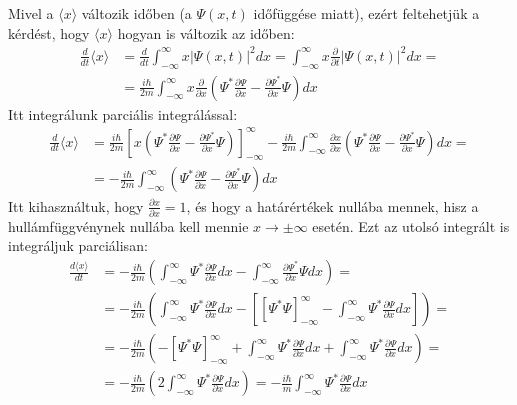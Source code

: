 \documentclass[../main.tex]{subfiles}
\begin{document}
Mivel a $\langle x \rangle$ változik időben (a $\Psi(x, t)$ időfüggése miatt), ezért feltehetjük a kérdést, hogy $\langle x \rangle$ hogyan is változik az időben:
\begin{equation}
    \begin{aligned}
        \frac{d}{dt} \langle x \rangle &= \frac{d}{dt} \int_{-\infty}^{\infty} x |\Psi(x,t)|^2 dx = \int_{-\infty}^{\infty} x \frac{\partial}{\partial t} |\Psi(x,t)|^2 dx = \\
        &= \frac{i \hbar}{2m} \int_{-\infty}^{\infty} x \frac{\partial}{\partial x} \left( \Psi^* \frac{\partial \Psi}{\partial x} - \frac{\partial \Psi^*}{\partial x} \Psi \right) dx
    \end{aligned}
\end{equation}
Itt integrálunk parciális integrálással:
\begin{equation}
    \begin{aligned}
        \frac{d}{dt} \langle x \rangle &= \frac{i \hbar}{2m} \left[ x \left( \Psi^* \frac{\partial \Psi}{\partial x} - \frac{\partial \Psi^*}{\partial x} \Psi \right) \right]_{-\infty}^{\infty} - \frac{i \hbar}{2m} \int_{-\infty}^{\infty} \frac{\partial x}{\partial x} \left( \Psi^* \frac{\partial \Psi}{\partial x} - \frac{\partial \Psi^*}{\partial x} \Psi \right) dx = \\
        &= -\frac{i \hbar}{2m} \int_{-\infty}^{\infty} \left( \Psi^* \frac{\partial \Psi}{\partial x} - \frac{\partial \Psi^*}{\partial x} \Psi \right) dx
    \end{aligned}
\end{equation}
Itt kihasználtuk, hogy $\frac{\partial x}{\partial x} = 1$, és hogy a határértékek nullába mennek, hisz a hullámfüggvénynek nullába kell mennie $x \to \pm \infty$ esetén. Ezt az utolsó integrált is integráljuk parciálisan:
\begin{equation}
    \begin{aligned}
        \frac{d \langle x \rangle}{dt} &= -\frac{i \hbar}{2m} \left(\int_{-\infty}^{\infty} \Psi^* \frac{\partial \Psi}{\partial x} dx - \int_{-\infty}^{\infty} \frac{\partial \Psi^*}{\partial x} \Psi dx \right) = \\
        &= -\frac{i \hbar}{2m} \left( \int_{-\infty}^{\infty} \Psi^* \frac{\partial \Psi}{\partial x} dx - \left[\left[\Psi^*\Psi\right]_{-\infty}^{\infty} - \int_{-\infty}^{\infty} \Psi^* \frac{\partial \Psi}{\partial x} dx \right] \right) = \\
        &= -\frac{i \hbar}{2m} \left( - \left[\Psi^*\Psi\right]_{-\infty}^{\infty} + \int_{-\infty}^{\infty} \Psi^* \frac{\partial \Psi}{\partial x} dx + \int_{-\infty}^{\infty} \Psi^* \frac{\partial \Psi}{\partial x} dx \right) = \\
        &= -\frac{i \hbar}{2m} \left( 2 \int_{-\infty}^{\infty} \Psi^* \frac{\partial \Psi}{\partial x} dx \right) = -\frac{i \hbar}{m} \int_{-\infty}^{\infty} \Psi^* \frac{\partial \Psi}{\partial x} dx
    \end{aligned}
\end{equation}
\end{document}

